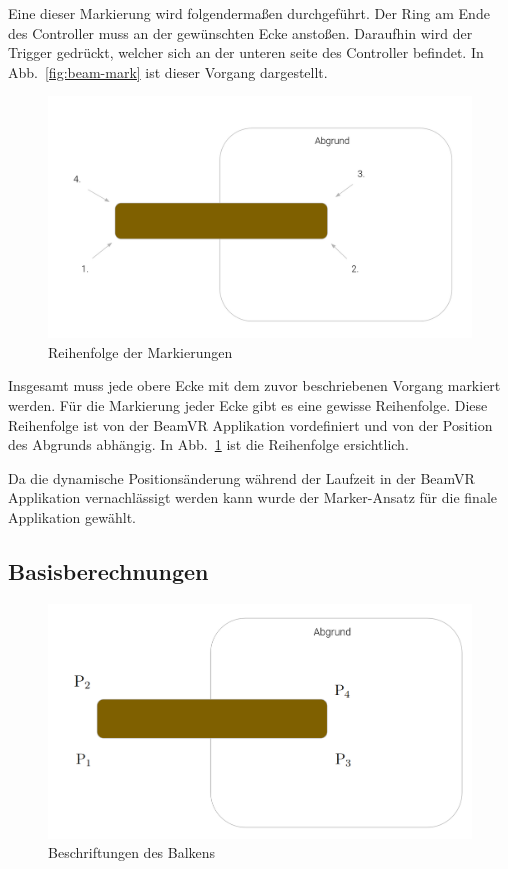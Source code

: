 Eine dieser Markierung wird folgendermaßen durchgeführt.
Der Ring am Ende des Controller muss an der gewünschten Ecke anstoßen.
Daraufhin wird der Trigger gedrückt, welcher sich an der unteren seite des Controller befindet.
In Abb.~\ref{fig:beam-mark} ist dieser Vorgang dargestellt.

\begin{figure}
    \centering
    \includegraphics[scale=0.25]{pics/beam-marking-sequence}
    \caption{Reihenfolge der Markierungen}
    \label{fig:beam-marking-sequence}
\end{figure}

Insgesamt muss jede obere Ecke mit dem zuvor beschriebenen Vorgang markiert werden.
Für die Markierung jeder Ecke gibt es eine gewisse Reihenfolge.
Diese Reihenfolge ist von der BeamVR Applikation vordefiniert und von der Position des Abgrunds abhängig.
In Abb.~\ref{fig:beam-marking-sequence} ist die Reihenfolge ersichtlich.

Da die dynamische Positionsänderung während der Laufzeit in der BeamVR Applikation vernachlässigt werden kann wurde der Marker-Ansatz für die finale Applikation gewählt.

\subsection{Basisberechnungen}
\label{subsec:basisberechnungen}

\begin{figure}
    \centering
    \includegraphics[scale=0.25]{pics/beam-point-labeling}
    \caption{Beschriftungen des Balkens}
    \label{fig:beam-point-labeling}
\end{figure}


